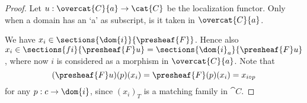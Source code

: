 
\begin{proof}
Let $u: \overcat{C}{a} \rightarrow \cat{C}$ be the localization functor.
Only when a domain has an `a' as subscript, is it taken in $\overcat{C}{a}$.

We have $x_{i} \in \sections{\dom{i}}{\presheaf{F}}$.
Hence also $x_{i} \in \sections{fi}{\presheaf{F}u} = \sections{\dom{i}_a}{\presheaf{F}u}$,
where now $i$ is considered as a morphism in $\overcat{C}{a}$.
Note that 
\[(\presheaf{F}u)(p)(x_{i}) 
	= \presheaf{F}(p)(x_{i}) =x_{i \circ p}
\]
for any $p:c \rightarrow \dom{i}$,
since $(x_{i})_T$ is a matching family in $\cat{C}$.
\end{proof}
